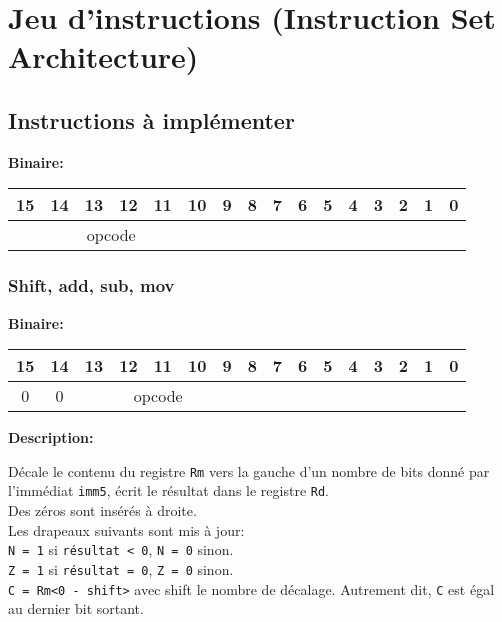 \section{Jeu d'instructions (Instruction Set Architecture)}

\subsection{Instructions à implémenter}

\textbf{Binaire:}\\

\begin{tabular}{| c c c c c c c c c c c c c c c c |}
\hline
15 & 14 & 13 & 12 & 11 & 10 & \multicolumn{1}{|c}{9} & 8 & 7 & 6 & 5 & 4 & 3 & 2 & 1 & 0 \\
\hline
\multicolumn{6}{|c}{opcode} & \multicolumn{10}{|c|}{} \\
\hline
\end{tabular}


\subsubsection{Shift, add, sub, mov}

\textbf{Binaire:}\\

\begin{tabular}{| c c c c c c c c c c c c c c c c |}
\hline
15 & 14 & \multicolumn{1}{|c}{13} & 12 & 11 & 10 & 9 & \multicolumn{1}{|c}{8} & 7 & 6 & 5 & 4 & 3 & 2 & 1 & 0 \\
\hline
0 & 0 & \multicolumn{5}{|c}{opcode} & \multicolumn{9}{|c|}{} \\
\hline
\end{tabular}



\textbf{Description: }

Décale le contenu du registre \texttt{Rm} vers la gauche d'un nombre de bits donné par l'immédiat \texttt{imm5}, écrit le résultat dans le registre \texttt{Rd}.\\
Des zéros sont insérés à droite.\\
Les drapeaux suivants sont mis à jour:\\
\texttt{N = 1} si \texttt{résultat < 0}, \texttt{N = 0} sinon.\\                                      
\texttt{Z = 1} si \texttt{résultat = 0}, \texttt{Z = 0} sinon.\\
\texttt{C = Rm<0 - shift>} avec shift le nombre de décalage. Autrement dit, \texttt{C} est égal au dernier bit sortant.\\

